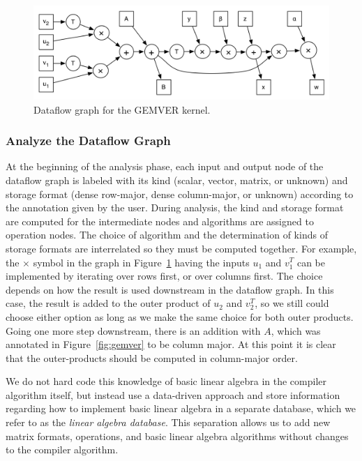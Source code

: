 \documentclass[11pt]{article}
\begin{document}
\begin{figure}[htbp]
\centering
\includegraphics[width=.7\textwidth]{figures/gemver-dataflow.png}
 
\caption{Dataflow graph for the GEMVER kernel.}
\label{fig:gemver-dataflow}
\end{figure}

\subsubsection{Analyze the Dataflow Graph}

At the beginning of the analysis phase, each input and output node of the dataflow graph is labeled with its kind (scalar, vector, matrix, or unknown) and storage format (dense row-major, dense column-major, or unknown) according to the annotation given by the user.  During analysis, the kind and storage format are computed for the intermediate nodes and algorithms are assigned to operation nodes. The choice of algorithm and the determination of kinds of storage formats are interrelated so they must be computed together.  For example, the $\times$ symbol in the graph in Figure~\ref{fig:gemver-dataflow} having the inputs $u_1$ and $v_1^T$ can be implemented by iterating over rows first, or over columns first. The choice depends on how the result is used downstream in the dataflow graph.  In this case, the result is added to the outer product of $u_2$ and $v_2^T$, so we still could choose either option as long as we make the same choice for both outer products. Going one more step downstream, there is an addition with $A$, which was annotated in Figure~\ref{fig:gemver} to be column major. At this point it is clear that the outer-products should be computed in column-major order.

We do not hard code this knowledge of basic linear algebra in the compiler algorithm itself, but instead use a data-driven approach and store information regarding how to implement basic linear algebra in a separate database, which we refer to as the \emph{linear algebra database}.  This separation allows us to add new matrix formats, operations, and basic linear algebra algorithms without changes to the
compiler algorithm. 
\end{document}
